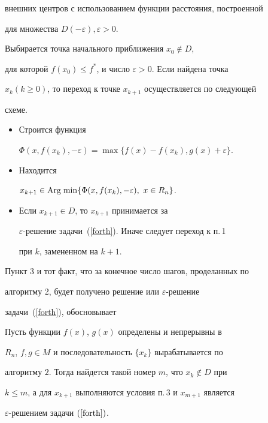 внешних центров с использованием функции расстояния, построенной


для множества $D(-\varepsilon), \varepsilon>0$.





\begin{alg}


Выбирается точка начального приближения $x_0\notin D$,


для которой $f(x_0)\le f^*$, и число $\varepsilon>0$. Если найдена точка


$x_k (k\ge0)$, то переход к точке $x_{k+1}$ осуществляется по следующей


схеме.


\begin{itemize}


\item[1.] Строится функция


$\Phi(x,f(x_k),-\varepsilon)=\max\{f(x)-f(x_k),g(x)+\varepsilon\}$.


\item[2.] Находится


$x_{k+1}\in\Argmin\{\Phi(x,f(x_k),-\varepsilon),\ x\in R_n\}$.


\item[3.] Если $x_{k+1}\in D$, то $x_{k+1}$ принимается за


$\varepsilon$-решение задачи~(\ref{forth}). Иначе следует переход к п.\,1


при $k$, замененном на $k+1$.


\end{itemize}


\end{alg}





Пункт 3 и тот факт, что за конечное число шагов, проделанных по


алгоритму 2, будет получено решение или $\varepsilon$-решение


задачи~(\ref{forth}), обосновывает





\begin{thm}


Пусть функции $f(x)$, $g(x)$ определены и непрерывны в


$R_n$, $f,g\in M$ и последовательность $\{x_k\}$ вырабатывается по


алгоритму $2$. Тогда найдется такой номер $m$, что $x_k\notin D$ при


$k\le m$, а для $x_{k+1}$ выполняются условия п.\,$3$ и $x_{m+1}$ является


$\varepsilon$-решением задачи $(\ref{forth})$.


\end{thm}





